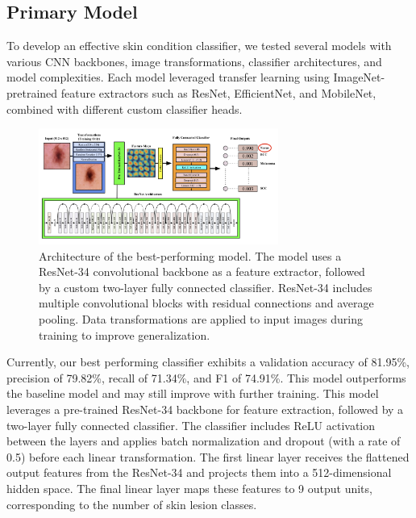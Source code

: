 \documentclass{article} %
\begin{document}
\subsection{Primary Model}

To develop an effective skin condition classifier, we tested several models with various CNN backbones, image transformations, classifier architectures, and model complexities. Each model leveraged transfer learning using ImageNet-pretrained feature extractors such as ResNet, EfficientNet, and MobileNet, combined with different custom classifier heads.

\begin{figure}[h]
\begin{center}
\includegraphics[width=0.7\textwidth]{Figs/model_architecture.png}
\end{center}
\caption{Architecture of the best-performing model. The model uses a ResNet-34 convolutional backbone as a feature extractor, followed by a custom two-layer fully connected classifier. ResNet-34 includes multiple convolutional blocks with residual connections and average pooling. Data transformations are applied to input images during training to improve generalization.}
\end{figure}

Currently, our best performing classifier exhibits a validation accuracy of 81.95\%, precision of 79.82\%, recall of 71.34\%, and F1 of 74.91\%. This model outperforms the baseline model and may still improve with further training. This model leverages a pre-trained ResNet-34 backbone for feature extraction, followed by a two-layer fully connected classifier. The classifier includes ReLU activation between the layers and applies batch normalization and dropout (with a rate of 0.5) before each linear transformation. The first linear layer receives the flattened output features from the ResNet-34 and projects them into a 512-dimensional hidden space. The final linear layer maps these features to 9 output units, corresponding to the number of skin lesion classes.
\end{document}
